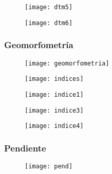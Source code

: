 \documentclass[14pt]{beamer}
\begin{document}
\begin{frame}
  \begin{figure}
    \centering
    \texttt{[image: dtm5]}
  \end{figure}
\end{frame}
\begin{frame}
  \begin{figure}
    \centering
    \texttt{[image: dtm6]}
  \end{figure}
\end{frame}
\begin{frame}
\frametitle{Geomorfometría}
  \begin{figure}
    \centering
    \texttt{[image: geomorfometria]}
  \end{figure}
\end{frame}
\begin{frame}
  \begin{figure}
    \centering
    \texttt{[image: indices]}
  \end{figure}
\end{frame}
\begin{frame}
  \begin{figure}
    \centering
    \texttt{[image: indice1]}
  \end{figure}
\end{frame}
\begin{frame}
  \begin{figure}
    \centering
    \texttt{[image: indice3]}
  \end{figure}
\end{frame}
\begin{frame}
  \begin{figure}
    \centering
    \texttt{[image: indice4]}
  \end{figure}
\end{frame}
\begin{frame}
\frametitle{Pendiente}
  \begin{figure}
    \centering
    \texttt{[image: pend]}
  \end{figure}
\end{frame}
\end{document}

